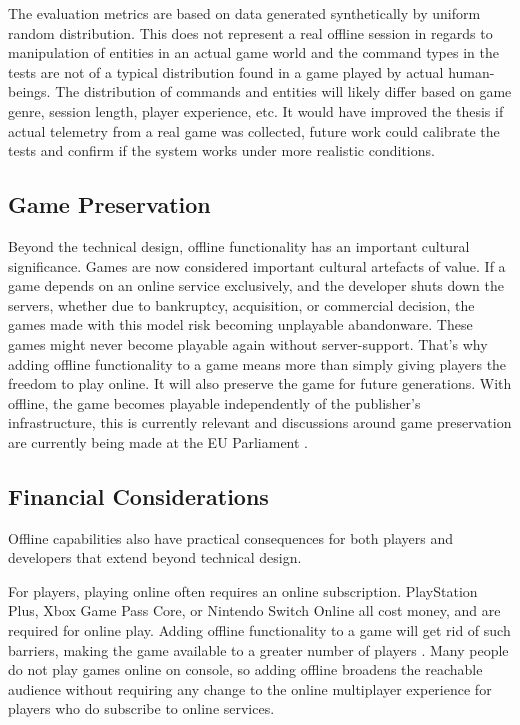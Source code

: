 \documentclass{article}
\begin{document}
The evaluation metrics are based on data generated synthetically by uniform random distribution. This does not represent a real offline session in regards to manipulation of entities in an actual game world and the command types in the tests are not of a typical distribution found in a game played by actual human-beings. The distribution of commands and entities will likely differ based on game genre, session length, player experience, etc. It would have improved the thesis if actual telemetry from a real game was collected, future work could calibrate the tests and confirm if the system works under more realistic conditions.

\subsection{Game Preservation}

Beyond the technical design, offline functionality has an important cultural significance. Games are now considered important cultural artefacts of value. If a game depends on an online service exclusively, and the developer shuts down the servers, whether due to bankruptcy, acquisition, or commercial decision, the games made with this model risk becoming unplayable abandonware. These games might never become playable again without server-support. That's why adding offline functionality to a game means more than simply giving players the freedom to play online. It will also preserve the game for future generations. With offline, the game becomes playable independently of the publisher's infrastructure, this is currently relevant and discussions around game preservation are currently being made at the EU Parliament \autocite{ross}.

\subsection{Financial Considerations}

Offline capabilities also have practical consequences for both players and developers that extend beyond technical design.

For players, playing online often requires an online subscription. PlayStation Plus, Xbox Game Pass Core, or Nintendo Switch Online all cost money, and are required for online play. Adding offline functionality to a game will get rid of such barriers, making the game available to a greater number of players \autocite{onlinegamers}. Many people do not play games online on console, so adding offline broadens the reachable audience without requiring any change to the online multiplayer experience for players who do subscribe to online services.
\end{document}
